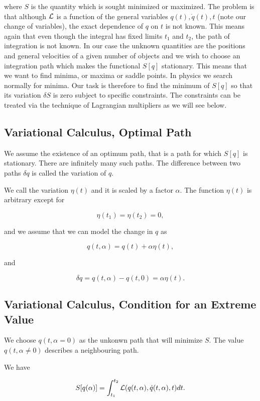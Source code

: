 \documentclass[%
oneside,                 %
final,                   %
10pt]{article}
\begin{document}
where $S$ is the quantity which is sought minimized or maximized.  The
problem is that although ${\cal L}$  is a function of the general variables
$q(t),\dot{q}(t),t$ (note our change of variables), the exact dependence of $q$ on $t$ is not known.
This means again that even though the integral has fixed limits $t_1$
and $t_2$, the path of integration is not known. In our case the unknown
quantities are the positions and general velocities of a given number
of objects and we wish to choose an integration path which makes the
functional $S[q]$ stationary. This means that we want to find minima,
or maxima or saddle points. In physics we search normally for minima.
Our task is therefore to find the minimum of $S[q]$ so that its
variation $\delta S$ is zero subject to specific constraints.  The
constraints can be treated via the technique of Lagrangian multipliers
as we will see below.

\subsection{Variational Calculus, Optimal Path}

We assume the existence of an optimum path, that is a path for which
$S[q]$ is stationary. There are infinitely many such paths.  The
difference between two paths $\delta q$ is called the variation of
$q$.

We call the variation $\eta(t)$ and it is scaled by a factor $\alpha$.
The function $\eta(t)$ is arbitrary except for

\[
\eta(t_1)=\eta(t_2)=0,
\]

and we assume that we can model the change in $q$ as

\[
q(t,\alpha) = q(t)+\alpha\eta(t),
\]

and

\[
\delta q = q(t,\alpha) -q(t,0)=\alpha\eta(t).
\]

\subsection{Variational Calculus, Condition for an Extreme Value}

We choose $q(t,\alpha=0)$ as the unkonwn path  that will minimize $S$.  The value
$q(t,\alpha\ne 0)$  describes a neighbouring path.

We have

\[
S[q(\alpha)]= \int_{t_1}^{t_2} {\cal L}(q(t,\alpha),\dot{q}(t,\alpha),t)dt.
\]
\end{document}

